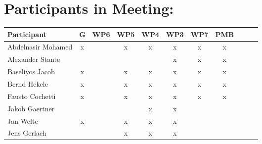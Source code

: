 \documentclass[a4paper, 11pt]{article}
\begin{document}
\section{Participants in Meeting:}

\begin{tabular}{|l|c|c|c|c||c|c|c||c|c|c|}
\hline
\textbf{Participant}  & \textbf{G} & \textbf{WP6} &  \textbf{WP5} & \textbf{WP4}&  \textbf{WP3} & \textbf{WP7}&  \textbf{PMB} \\\hline
Abdelnasir Mohamed    & x &   & x & x & x & x & x \\\hline 
Alexander Stante     &   &   &   &   & x & x & x \\\hline 
Baseliyos Jacob      & x &   & x & x & x & x & x \\\hline 
Bernd Hekele         & x &   & x & x & x & x & x \\\hline
Fausto Cochetti      & x &   & x & x & x & x & x \\\hline
Jakob Gaertner       &   &   &   & x & x &   &   \\\hline
Jan Welte            & x &   & x & x & x &   &   \\\hline
Jens Gerlach         &   &   & x & x & x &   &   \\\hline

\end{tabular}
\end{document}
